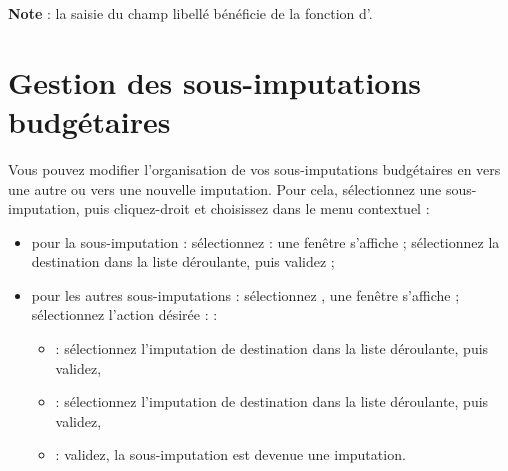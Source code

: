 \textbf{Note} : la saisie du champ libellé  bénéficie de la fonction d'.

\ifIllustration
\fi


\section{Gestion des sous-imputations budgétaires\label{budgetarylines-management}}


Vous pouvez modifier l'organisation de vos sous-imputations budgétaires en  vers une autre ou vers une nouvelle imputation. Pour cela, sélectionnez une sous-imputation, puis cliquez-droit et choisissez dans le menu contextuel : 


\begin{itemize}
	 \item pour la sous-imputation  : sélectionnez  : une fenêtre s'affiche ; sélectionnez la destination dans la liste déroulante, puis validez ;

	 \item pour les autres sous-imputations : sélectionnez , une fenêtre s'affiche ; sélectionnez l'action désirée \ifIllustration {} :
	 \else  :
	 \fi
		\begin{itemize}
			 \item {} : sélectionnez l'imputation de destination dans la liste déroulante, puis validez,
			 \item {} : sélectionnez l'imputation de destination dans la liste déroulante, puis validez,
			 \item {} : validez, la sous-imputation est devenue une imputation.
		\end{itemize}
\end{itemize}

